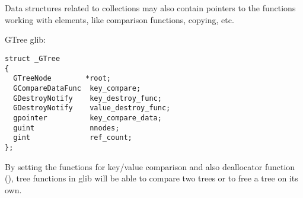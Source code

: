 ﻿\section{}




\subsection{}

{Data structures related to collections may also contain pointers to the functions working with elements,
like comparison functions, copying, etc}.

 \InENRU GTree \InENRU glib:

\begin{lstlisting}[caption=gtree.c]
struct _GTree
{
  GTreeNode        *root;
  GCompareDataFunc  key_compare;
  GDestroyNotify    key_destroy_func;
  GDestroyNotify    value_destroy_func;
  gpointer          key_compare_data;
  guint             nnodes;
  gint              ref_count;
};
\end{lstlisting}

{By setting the functions for key/value comparison and also deallocator function} (\InENRU {}),
{tree functions in glib will be able to compare two trees or to free a tree on its own}.

